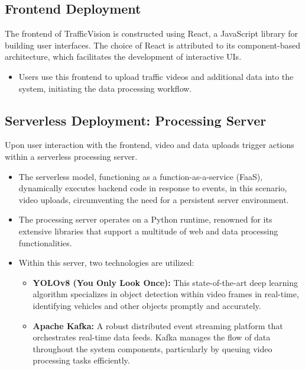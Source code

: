 \subsection{Frontend Deployment}
The frontend of TrafficVision is constructed using React, a  JavaScript library for building user interfaces. The choice of React is attributed to its component-based architecture, which facilitates the development of interactive UIs.
\begin{itemize}
    \item Users use this frontend to upload traffic videos and additional data into the system, initiating the data processing workflow.
\end{itemize}

\subsection{Serverless Deployment: Processing Server}
Upon user interaction with the frontend, video and data uploads trigger actions within a serverless processing server.
\begin{itemize}
    \item The serverless model, functioning as a function-as-a-service (FaaS), dynamically executes backend code in response to events, in this scenario, video uploads, circumventing the need for a persistent server environment.
    
    \item The processing server operates on a Python runtime, renowned for its extensive libraries that support a multitude of web and data processing functionalities.
    
    \item Within this server, two technologies are utilized:
    \begin{itemize}
        \item \textbf{YOLOv8 (You Only Look Once):} This state-of-the-art deep learning algorithm specializes in object detection within video frames in real-time, identifying vehicles and other objects promptly and accurately.
        
        \item \textbf{Apache Kafka:} A robust distributed event streaming platform that orchestrates real-time data feeds. Kafka manages the flow of data throughout the system components, particularly by queuing video processing tasks efficiently.
    \end{itemize}
\end{itemize}

